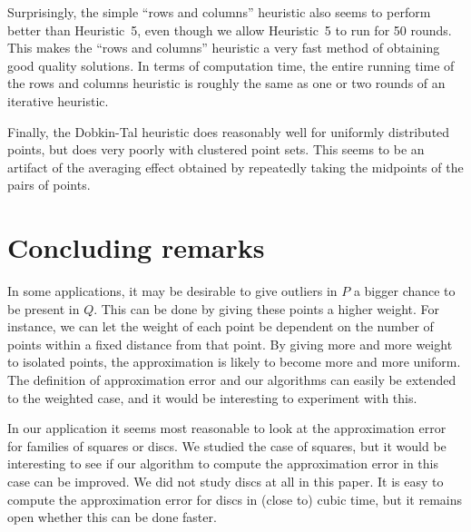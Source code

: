 \documentclass{elsart}
\begin{document}
Surprisingly, the simple ``rows and columns'' heuristic also seems to
perform better than Heuristic~5, even though we allow Heuristic~5 to
run for 50 rounds.  This makes the ``rows and columns'' heuristic a
very fast method of obtaining good quality solutions.  In terms of
computation time, the entire running time of the rows and columns
heuristic is roughly the same as one or two rounds of an iterative
heuristic.

Finally, the Dobkin-Tal heuristic does reasonably well for uniformly
distributed points, but does very poorly with clustered point
sets. This seems to be an artifact of the averaging effect obtained by
repeatedly taking the midpoints of the pairs of points.



\section{Concluding remarks}
\label{se:concl}
In some applications, it may be desirable to give outliers in $P$ a
bigger chance to be present in $Q$.  This can be done by giving these
points a higher weight. For instance, we can let the weight of each
point be dependent on the number of points within a fixed distance
from that point. By giving more and more weight to isolated points,
the approximation is likely to become more and more uniform.  The
definition of approximation error and our algorithms can easily be
extended to the weighted case, and it would be interesting to
experiment with this.  

In our application it seems most reasonable to look at the
approximation error for families of squares or discs.  We studied the
case of squares, but it would be interesting to see if our algorithm
to compute the approximation error in this case can be improved.  We
did not study discs at all in this paper.  It is easy to compute the
approximation error for discs in (close to) cubic time, but it remains
open whether this can be done faster.
\end{document}
